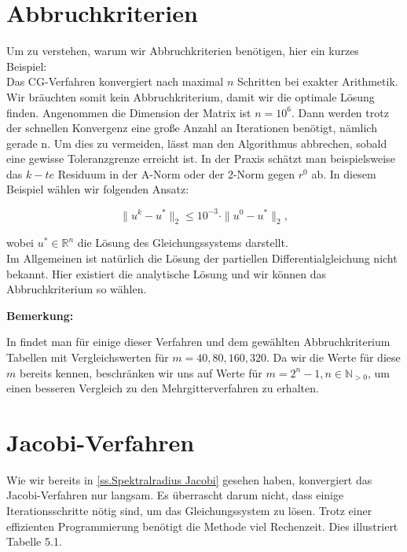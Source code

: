 

\section{Abbruchkriterien}

Um zu verstehen, warum wir Abbruchkriterien benötigen, hier ein kurzes Beispiel:\\
Das CG-Verfahren konvergiert nach maximal $n$ Schritten bei exakter Arithmetik. Wir bräuchten somit kein Abbruchkriterium, damit wir die optimale Lösung finden. Angenommen die Dimension der Matrix ist $n = 10^{6}$. Dann werden trotz der schnellen Konvergenz eine große Anzahl an Iterationen benötigt, nämlich gerade n. Um dies zu vermeiden, lässt man den Algorithmus abbrechen, sobald eine gewisse Toleranzgrenze erreicht ist. In der Praxis schätzt man beispielsweise das $k-te$ Residuum in der A-Norm oder der 2-Norm gegen $r^{0}$ ab. In diesem Beispiel wählen wir folgenden Ansatz:

\begin{equation}
\| u^{k} - u^{*} \|_{2} \le 10^{-3} \cdot \| u^{0} - u^{*} \|_{2},
\end{equation}

wobei $u^{*} \in \mathbb{R}^{n}$ die Lösung des Gleichungssystems darstellt.\\
Im Allgemeinen ist natürlich die Lösung der partiellen Differentialgleichung nicht bekannt. Hier existiert die analytische Lösung und wir können das Abbruchkriterium so wählen.

\textbf{Bemerkung:}

In \cite{DR4} findet man für einige dieser Verfahren und dem gewählten Abbruchkriterium Tabellen mit Vergleichswerten für $m = 40,80,160,320$. Da wir die Werte für diese $m$ bereits kennen, beschränken wir uns auf Werte für $m = 2^{n} - 1, n \in \mathbb{N}_{>0}$, um einen besseren Vergleich zu den Mehrgitterverfahren zu erhalten.

\section{Jacobi-Verfahren}\label{s.Jacobi mit Beispiel}

Wie wir bereits in \autoref{ss.Spektralradius Jacobi} gesehen haben, konvergiert das Jacobi-Verfahren nur langsam. Es überrascht darum nicht, dass einige Iterationsschritte nötig sind, um das Gleichungssystem zu lösen. Trotz einer effizienten Programmierung benötigt die Methode viel Rechenzeit. Dies illustriert Tabelle 5.1.

